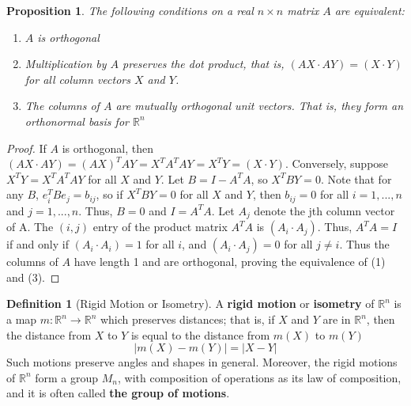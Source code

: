 \documentclass[12pt]{article}
\newtheorem{prop}[thm]{Proposition}
\theoremstyle{definition}
\newtheorem{defn}[thm]{Definition}
\theoremstyle{remark}
\numberwithin{equation}{section}
\newcommand\R{\mathbb R}    %
\newcommand\B[1]{\textbf{ #1}}
\begin{document}
\begin{prop}
        The following conditions on a real $n\times n$ matrix $A$ are equivalent: \begin{enumerate}
                \item $A$ is orthogonal
                \item Multiplication by $A$ preserves the dot product, that is, $(AX\cdot AY) = (X\cdot Y)$ for all column vectors $X$ and $Y$.
                \item The columns of $A$ are mutually orthogonal unit vectors. That is, they form an orthonormal basis for $\R^n$
        \end{enumerate}
\end{prop}
\begin{proof}
        If $A$ is orthogonal, then $(AX\cdot AY) = (AX)^TAY = X^TA^TAY = X^TY = (X\cdot Y)$. Conversely, suppose $X^TY = X^TA^TAY$ for all $X$ and $Y$. Let $B = I - A^TA$, so $X^TBY = 0$. Note that for any $B$, $e_i^TBe_j = b_{ij}$, so if $X^TBY = 0$ for all $X$ and $Y$, then $b_{ij} = 0$ for all $i=1,...,n$ and $j = 1,...,n$. Thus, $B=0$ and $I = A^TA$. Let $A_j$ denote the jth column vector of A. The $(i,j)$ entry of the product matrix $A^TA$ is $(A_i \cdot A_j)$. Thus, $A^TA = I$ if and only if $(A_i\cdot A_i) = 1$ for all $i$, and $(A_i \cdot A_j) = 0$ for all $j \neq i$. Thus the columns of $A$ have length 1 and are orthogonal, proving the equivalence of (1) and (3).
\end{proof}



\vspace{15pt}


\begin{defn}[Rigid Motion or Isometry]
        A \B{rigid motion} or \B{isometry} of $\R^n$ is a map $m:\R^n\rightarrow \R^n$ which preserves distances; that is, if $X$ and $Y$ are in $\R^n$, then the distance from $X$ to $Y$ is equal to the distance from $m(X)$ to $m(Y)$ \begin{equation}
                |m(X) - m(Y)| = |X - Y|
        \end{equation}
        Such motions preserve angles and shapes in general. Moreover, the rigid motions of $\R^n$ form a group $M_n$, with composition of operations as its law of composition, and it is often called \B{the group of motions}.
\end{defn}

\vspace{15pt}
\end{document}

